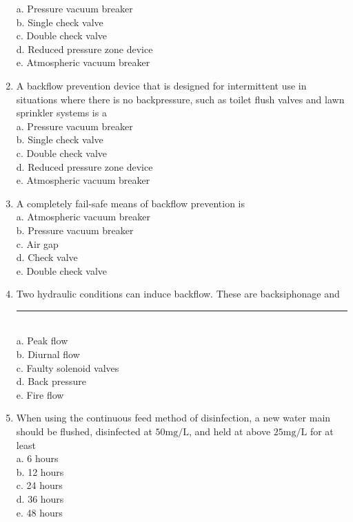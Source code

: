 \begin{enumerate}[1.]
a. Pressure vacuum breaker\\

b. Single check valve\\

c. Double check valve\\

d. Reduced pressure zone device\\

e. Atmospheric vacuum breaker\\

  \item A backflow prevention device that is designed for intermittent use in situations where there is no backpressure, such as toilet flush valves and lawn sprinkler systems is a\\
a. Pressure vacuum breaker\\

b. Single check valve\\

c. Double check valve\\

d. Reduced pressure zone device\\

e. Atmospheric vacuum breaker\\


  \item A completely fail-safe means of backflow prevention is\\
a. Atmospheric vacuum breaker\\
b. Pressure vacuum breaker\\
c. Air gap\\
d. Check valve\\
e. Double check valve

  \item Two hydraulic conditions can induce backflow. These are backsiphonage and \rule{1.5cm}{0.3mm}\\
a. Peak flow\\
b. Diurnal flow\\
c. Faulty solenoid valves\\
d. Back pressure\\
e. Fire flow\\

\item When using the continuous feed method of disinfection, a new water main should be flushed, disinfected at $50 \mathrm{mg} / \mathrm{L}$, and held at above $25 \mathrm{mg} / \mathrm{L}$ for at least\\
a. 6 hours\\
b. 12 hours\\
c. 24 hours\\
d. 36  hours\\
e. 48 hours\\


\end{enumerate}
